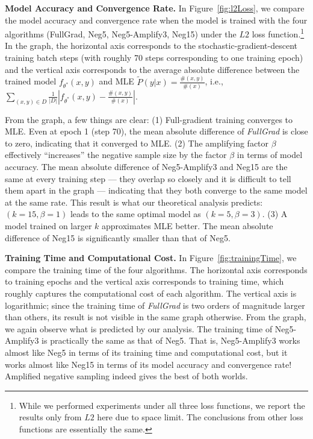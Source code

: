 \textbf{Model Accuracy and Convergence Rate.} 
In Figure~\ref{fig:l2Loss}, we compare the model accuracy and convergence rate when the model is trained with the four algorithms (FullGrad, Neg5, Neg5-Amplify3, Neg15) under the $L2$ loss function.\footnote{While we performed experiments under all three loss functions, we report the results only from $L2$ here due to space limit. The conclusions from other loss functions are essentially the same.} In the graph, the horizontal axis corresponds to the stochastic-gradient-descent training batch steps (with roughly 70 steps corresponding to one training epoch) and the vertical axis corresponds to the average absolute difference between the trained model $f_{\theta^*}(x, y)$ and MLE $\tilde{P}(y|x) = \frac{\#(x,y)}{\#(x)}$, i.e., $\sum_{(x,y)\in D} \frac{1}{\vert D\vert}\left\vert f_{\theta^*}(x, y) - \frac{\#(x,y)}{\#(x)}\right\vert$. 

From the graph, a few things are clear: (1) Full-gradient training converges to MLE. Even at epoch 1 (step 70), the mean absolute difference of \emph{FullGrad} is close to zero, indicating that it converged to MLE. (2) The amplifying factor $\beta$ effectively ``increases'' the negative sample size by the factor $\beta$ in terms of model accuracy. The mean absolute difference of Neg5-Amplify3 and Neg15 are the same at every training step --- they overlap so closely and it is difficult to tell them apart in the graph --- indicating that they both converge to the same model at the same rate. This result is what our theoretical analysis predicts: $(k=15, \beta = 1)$ leads to the same optimal model as $(k=5, \beta=3)$. (3) A model trained on larger $k$ approximates MLE better. The mean absolute difference of Neg15 is significantly smaller than that of Neg5. 

\textbf{Training Time and Computational Cost.} In Figure~\ref{fig:trainingTime}, we compare the training time of the four algorithms. The horizontal axis corresponds to training epochs and the vertical axis corresponds to training time, which roughly captures the computational cost of each algorithm. The vertical axis is logarithmic; since the training time of \emph{FullGrad} is two orders of magnitude larger than others, its result is not visible in the same graph otherwise. From the graph, we again observe what is predicted by our analysis. The training time of Neg5-Amplify3 is practically the same as that of Neg5. That is, Neg5-Amplify3 works almost like Neg5 in terms of its training time and computational cost, but it works almost like  Neg15 in terms of its model accuracy and convergence rate! Amplified negative sampling indeed gives the best of both worlds.

